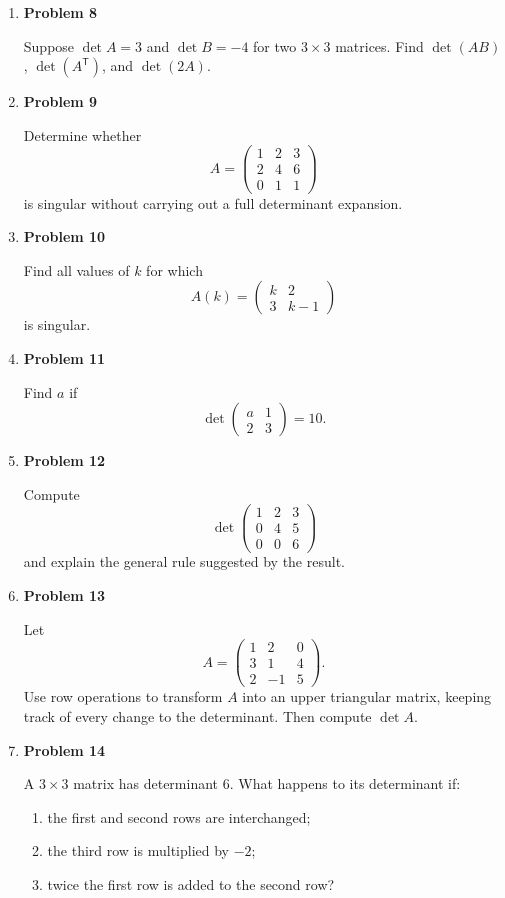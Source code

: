 \begin{enumerate}
\item \textbf{Problem 8}\par
Suppose \(\det A=3\) and \(\det B=-4\) for two \(3\times3\) matrices. Find \(\det(AB)\), \(\det(A^{\mathsf T})\), and \(\det(2A)\).

\item \textbf{Problem 9}\par
Determine whether
\[
A=\begin{pmatrix}
1&2&3\\
2&4&6\\
0&1&1
\end{pmatrix}
\]
is singular without carrying out a full determinant expansion.

\item \textbf{Problem 10}\par
Find all values of \(k\) for which
\[
A(k)=\begin{pmatrix}
k&2\\
3&k-1
\end{pmatrix}
\]
is singular.

\item \textbf{Problem 11}\par
Find \(a\) if
\[
\det\begin{pmatrix}
a&1\\
2&3
\end{pmatrix}=10.
\]

\item \textbf{Problem 12}\par
Compute
\[
\det\begin{pmatrix}
1&2&3\\
0&4&5\\
0&0&6
\end{pmatrix}
\]
and explain the general rule suggested by the result.

\item \textbf{Problem 13}\par
Let
\[
A=\begin{pmatrix}
1&2&0\\
3&1&4\\
2&-1&5
\end{pmatrix}.
\]
Use row operations to transform \(A\) into an upper triangular matrix, keeping track of every change to the determinant. Then compute \(\det A\).

\item \textbf{Problem 14}\par
A \(3\times3\) matrix has determinant \(6\). What happens to its determinant if:
\begin{enumerate}
\item the first and second rows are interchanged;
\item the third row is multiplied by \(-2\);
\item twice the first row is added to the second row?
\end{enumerate}


\end{enumerate}
